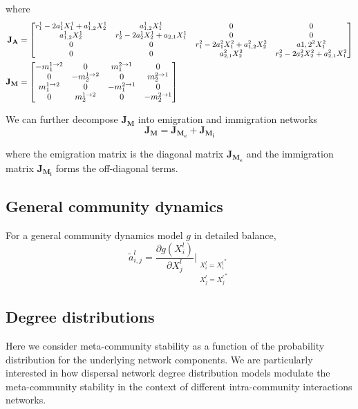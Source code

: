 \documentclass[12pt]{article}
\begin{document}
where
\begin{align*}
\mathbf{J_A} &= \small{\begin{bmatrix}
    r_1^1 - 2a_1^1X_1^1+a_{1,2}^1X_2^1 & a_{1,2}^1X_1^1 & 0 & 0 \\ 
    a_{1,2}^1X_2^1 & r_2^1 - 2a_2^1X_2^1 + a_{2,1}X_1^1 & 0 & 0 \\
    0 & 0 & r_1^2 -2a_1^2X_1^2 + a_{1,2}^2X_2^2  & a{1,2}^2X_1^2 \\
    0 & 0 & a_{2,1}^2X_2^2 & r_2^2 - 2a_2^2X_2^2 + a_{2,1}^2X_1^2 \\       
\end{bmatrix}} \\
 \mathbf{J_M} &= \begin{bmatrix}
    -m_1^{1\rightarrow 2} & 0 & m_1^{2\rightarrow 1} & 0 \\ 
    0 & -m_2^{1\rightarrow 2}& 0 & m_2^{2\rightarrow 1} \\
    m_1^{1\rightarrow 2} & 0 & -m_1^{2\rightarrow 1} & 0 \\
    0 & m_2^{1\rightarrow 2} & 0 & -m_2^{2\rightarrow 1} \\       
\end{bmatrix} 
\end{align*}

We can further decompose $\mathbf{J_M}$ into emigration and immigration networks
\[ \mathbf{J_M} = \mathbf{J_{M_e}} + \mathbf{J_{M_i}} \] 

where the emigration matrix is the diagonal matrix $\mathbf{J_{M_e}}$ and the immigration matrix $\mathbf{J_{M_i}}$ forms the off-diagonal terms. 

\subsection*{General community dynamics}
For a general community dynamics model $g$ in detailed balance, 
\[ \tilde{a}_{i,j}^l = \frac{\partial g(X_i^l)}{\partial X_j^l}\Bigr|_{\substack{{X_i^l=X_i^l}^*\\{X_j^l=X_j^l}^*}}  \]

\subsection*{Degree distributions}
Here we consider meta-community stability as a function of the probability distribution for the underlying network components. We are particularly interested in how dispersal network degree distribution models modulate the meta-community stability in the context of different intra-community interactions networks.
\end{document}
